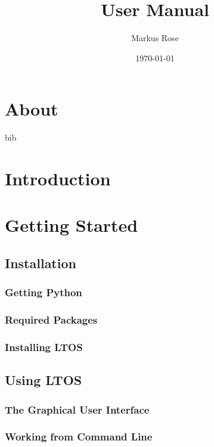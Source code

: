\documentclass[oneside,letterpaper]{scrbook}
\author{Markus Rose}
\title{\PN User Manual}
\date{\today}
\newcommand{\PN}{LTOS}
\begin{document}
\frontmatter
\maketitle

\tableofcontents

\listoffigures
\listoftables

\chapter{About}
bib\cite{einstein}
\mainmatter
\chapter{Introduction}

\chapter{Getting Started}

\section{Installation}

\subsection{Getting Python}

\subsection{Required Packages}

\subsection{Installing \PN}

\section{Using \PN}\parindent 0pt


\subsection{The Graphical User Interface}

\subsection{Working from Command Line}
\end{document}
